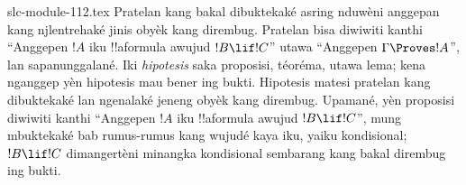 \begin{filecontents*}[overwrite]{slc-module-112.tex}
Pratelan kang bakal dibuktekaké asring nduwèni anggepan kang
njlentrehaké jinis obyèk kang dirembug. Pratelan bisa diwiwiti kanthi
``Anggepen $!A$ iku !!a{formula} awujud $!B \lif !C$'' utawa
``Anggepen $\Gamma \Proves !A$'', lan sapanunggalané. Iki
\emph{hipotesis} saka proposisi, téoréma, utawa lema;
kena nganggep yèn hipotesis mau bener ing bukti.
Hipotesis matesi pratelan kang dibuktekaké lan ngenalaké jeneng
obyèk kang dirembug. Upamané, yèn proposisi diwiwiti kanthi
``Anggepen $!A$ iku !!a{formula} awujud $!B \lif !C$'',
mung mbuktekaké bab rumus-rumus kang wujudé kaya iku,
yaiku kondisional; $!B \lif !C$ dimangertèni minangka kondisional
sembarang kang bakal dirembug ing bukti.


\end{filecontents*}

